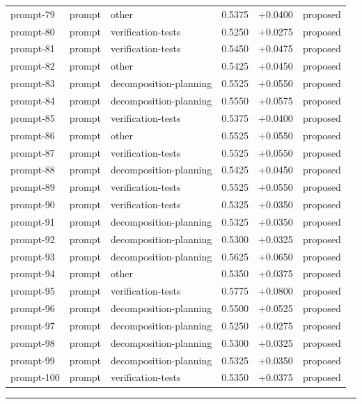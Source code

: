 \begin{center}
\begin{longtable}{llp{5.2cm}rrl}
prompt-79 & prompt & other & 0.5375 & +0.0400 & proposed \\
prompt-80 & prompt & verification-tests & 0.5250 & +0.0275 & proposed \\
prompt-81 & prompt & verification-tests & 0.5450 & +0.0475 & proposed \\
prompt-82 & prompt & other & 0.5425 & +0.0450 & proposed \\
prompt-83 & prompt & decomposition-planning & 0.5525 & +0.0550 & proposed \\
prompt-84 & prompt & decomposition-planning & 0.5550 & +0.0575 & proposed \\
prompt-85 & prompt & verification-tests & 0.5375 & +0.0400 & proposed \\
prompt-86 & prompt & other & 0.5525 & +0.0550 & proposed \\
prompt-87 & prompt & verification-tests & 0.5525 & +0.0550 & proposed \\
prompt-88 & prompt & decomposition-planning & 0.5425 & +0.0450 & proposed \\
prompt-89 & prompt & verification-tests & 0.5525 & +0.0550 & proposed \\
prompt-90 & prompt & verification-tests & 0.5325 & +0.0350 & proposed \\
prompt-91 & prompt & decomposition-planning & 0.5325 & +0.0350 & proposed \\
prompt-92 & prompt & decomposition-planning & 0.5300 & +0.0325 & proposed \\
prompt-93 & prompt & decomposition-planning & 0.5625 & +0.0650 & proposed \\
prompt-94 & prompt & other & 0.5350 & +0.0375 & proposed \\
prompt-95 & prompt & verification-tests & 0.5775 & +0.0800 & proposed \\
prompt-96 & prompt & decomposition-planning & 0.5500 & +0.0525 & proposed \\
prompt-97 & prompt & decomposition-planning & 0.5250 & +0.0275 & proposed \\
prompt-98 & prompt & decomposition-planning & 0.5300 & +0.0325 & proposed \\
prompt-99 & prompt & decomposition-planning & 0.5325 & +0.0350 & proposed \\
prompt-100 & prompt & verification-tests & 0.5350 & +0.0375 & proposed \\
\bottomrule\end{longtable}\end{center}
\par\bigskip\hrule\bigskip
